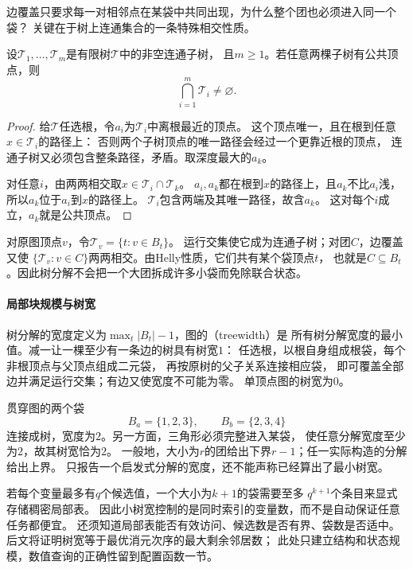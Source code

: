 边覆盖只要求每一对相邻点在某袋中共同出现，为什么整个团也必须进入同一个袋？
关键在于树上连通集合的一条特殊相交性质。

\begin{lemma}
  \label{lem:graph-theory-subtree-helly}
  设\(\mathcal T_1,\ldots,\mathcal T_m\)是有限树\(\mathcal T\)中的非空连通子树，
  且\(m\geq1\)。若任意两棵子树有公共顶点，则
  \[
    \bigcap_{i=1}^{m}\mathcal T_i\neq\varnothing.
  \]
\end{lemma}

\begin{proof}
给\(\mathcal T\)任选根，令\(a_i\)为\(\mathcal T_i\)中离根最近的顶点。
这个顶点唯一，且在根到任意\(x\in\mathcal T_i\)的路径上：
否则两个子树顶点的唯一路径会经过一个更靠近根的顶点，
连通子树又必须包含整条路径，矛盾。取深度最大的\(a_k\)。

对任意\(i\)，由两两相交取\(x\in\mathcal T_i\cap\mathcal T_k\)。
\(a_i,a_k\)都在根到\(x\)的路径上，且\(a_k\)不比\(a_i\)浅，
所以\(a_k\)位于\(a_i\)到\(x\)的路径上。
\(\mathcal T_i\)包含两端及其唯一路径，故含\(a_k\)。
这对每个\(i\)成立，\(a_k\)就是公共顶点。
\end{proof}

对原图顶点\(v\)，令\(\mathcal T_v=\{t:v\in B_t\}\)。
运行交集使它成为连通子树；对团\(C\)，边覆盖又使
\(\{\mathcal T_v:v\in C\}\)两两相交。由Helly性质，它们共有某个袋顶点\(t\)，
也就是\(C\subseteq B_t\)。因此树分解不会把一个大团拆成许多小袋而免除联合状态。

\paragraph{局部块规模与树宽}

树分解的宽度定义为\(\max_t|B_t|-1\)，图的（treewidth）是
所有树分解宽度的最小值。减一让一棵至少有一条边的树具有树宽\(1\)：
任选根，以根自身组成根袋，每个非根顶点与父顶点组成二元袋，
再按原树的父子关系连接相应袋，
即可覆盖全部边并满足运行交集；有边又使宽度不可能为零。
单顶点图的树宽为\(0\)。

贯穿图的两个袋
\[
  B_a=\{1,2,3\},\qquad B_b=\{2,3,4\}
\]
连接成树，宽度为\(2\)。另一方面，三角形必须完整进入某袋，
使任意分解宽度至少为\(2\)，故其树宽恰为\(2\)。
一般地，大小为\(r\)的团给出下界\(r-1\)；任一实际构造的分解给出上界。
只报告一个启发式分解的宽度，还不能声称已经算出了最小树宽。

若每个变量最多有\(q\)个候选值，一个大小为\(k+1\)的袋需要至多
\(q^{k+1}\)个条目来显式存储稠密局部表。
因此小树宽控制的是同时索引的变量数，而不是自动保证任意任务都便宜。
还须知道局部表能否有效访问、候选数是否有界、袋数是否适中。
后文将证明树宽等于最优消元次序的最大剩余邻居数；
此处只建立结构和状态规模，数值查询的正确性留到配置函数一节。

